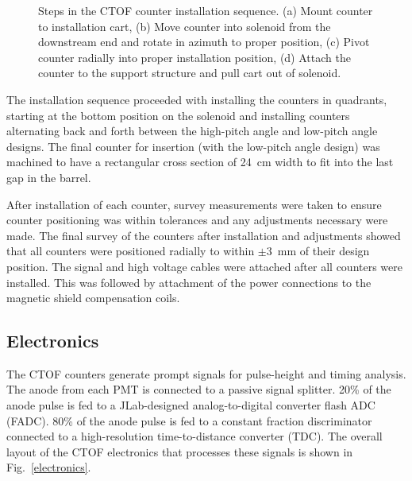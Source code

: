 \documentclass{elsart}
\begin{document}
\begin{figure}[htbp]
\begin{picture}
\end{picture} 
\caption{Steps in the CTOF counter installation sequence. (a) Mount counter to installation cart, (b) Move
counter into solenoid from the downstream end and rotate in azimuth to proper position, (c) Pivot counter
radially into proper installation position, (d) Attach the counter to the support structure and pull cart out of
solenoid.}
\label{install}
\end{figure}

The installation sequence proceeded with installing the counters in quadrants, starting at the bottom
position on the solenoid and installing counters alternating back and forth between the high-pitch
angle and low-pitch angle designs. The final counter for insertion (with the low-pitch angle design) was
machined to have a rectangular cross section of 24~cm width to fit into the last gap in the barrel.

After installation of each counter, survey measurements were taken to ensure counter positioning 
was within tolerances and any adjustments necessary were made. The final survey of the counters
after installation and adjustments showed that all counters were positioned radially to within
$\pm$3~mm of their design position. The signal and high voltage cables were attached after all
counters were installed. This was followed by attachment of the power connections to the magnetic
shield compensation coils.

\subsection{Electronics}
\label{sec-elec}

The CTOF counters generate prompt signals for pulse-height and timing analysis. The anode from 
each PMT is connected to a passive signal splitter. 20\% of the anode pulse is fed to a JLab-designed
analog-to-digital converter flash ADC (FADC). 80\% of the anode pulse is fed to a constant fraction
discriminator connected to a high-resolution time-to-distance converter (TDC). The overall layout of
the CTOF electronics that processes these signals is shown in Fig.~\ref{electronics}.
\end{document}
